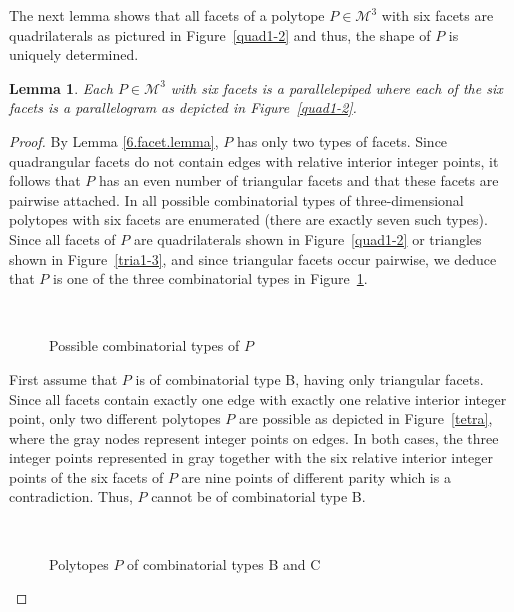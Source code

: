 \documentclass[a4paper]{article}
\theoremstyle{plain}
\newtheorem{lemma}[nn]{Lemma}
\begin{document}
The next lemma shows that all facets of a polytope $P \in
{\mathcal{M}^3}$ with six facets are quadrilaterals as pictured in
Figure~\ref{quad1-2} and thus, the shape of $P$ is uniquely
determined.

\begin{lemma}
Each $P \in {\mathcal{M}^3}$ with six facets is a parallelepiped where
each of the six facets is a parallelogram as depicted in
Figure~\ref{quad1-2}.
\end{lemma}

\begin{proof}
By Lemma \ref{6.facet.lemma}, $P$ has only two types of
facets.
Since quadrangular facets do not contain edges with relative
interior integer points, it follows that $P$ has an even
number of triangular facets and that these facets are
pairwise attached.
In \cite[Sections 6{.}2 and 6{.}3]{Gruenbaum03} all possible combinatorial types of three-dimensional polytopes with six facets are enumerated (there are exactly seven such types).
Since all facets of $P$ are quadrilaterals shown in
Figure~\ref{quad1-2} or triangles shown in
Figure~\ref{tria1-3}, and since triangular facets occur
pairwise, we deduce that $P$ is one of the three combinatorial
types in Figure~\ref{comb.types}. 

\begin{figure}[ht]
  \centering
  \mbox{
    \qquad
    \qquad
  }
  \caption{Possible combinatorial types of $P$}
  \label{comb.types}
\end{figure}

First assume that $P$ is of combinatorial type B, having
only triangular facets.
Since all facets contain exactly one edge with exactly one
relative interior integer point, only two different
polytopes $P$ are possible as depicted in
Figure~\ref{tetra}, where the gray nodes represent integer
points on edges.
In both cases, the three integer points represented in gray
together with the six relative interior integer points of
the six facets of $P$ are nine points of different parity
which is a contradiction.
Thus, $P$ cannot be of combinatorial type B.

\begin{figure}[ht]
  \centering
  \mbox{
    \qquad
  }
  \caption{Polytopes $P$ of combinatorial types B and C}
  \label{impossible}
\end{figure}


\end{proof}
\end{document}
